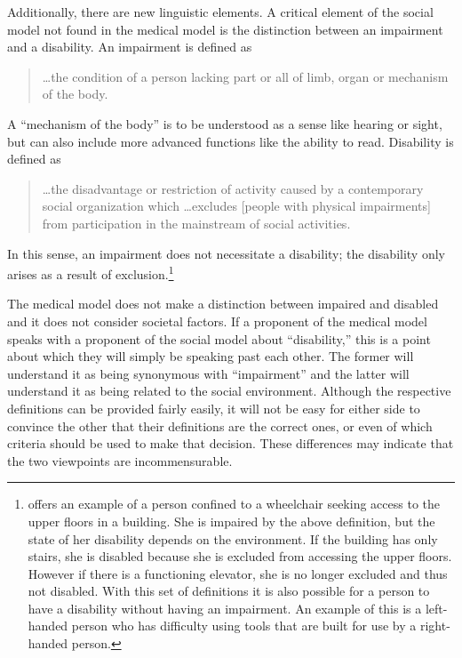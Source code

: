 \documentclass[a4paper]{article}
\begin{document}
Additionally, there are new linguistic elements. A critical element of the
social model not found in the medical model is the distinction between an
impairment and a disability. An impairment is defined as 
%
\begin{quote}
    \ldots the condition of a person lacking part or all of limb, organ or
    mechanism of the body. \citep{winter2003development} 
\end{quote}
%
A ``mechanism of the body'' is to be understood as a sense like hearing or
sight, but can also include more advanced functions like the ability to read.
Disability is defined as 
%
\begin{quote}
    \ldots the disadvantage or restriction of activity caused by a
    contemporary social organization which \ldots excludes [people with
    physical impairments] from participation in the mainstream of social
    activities. \citep{winter2003development}
\end{quote}
%
In this sense, an impairment does not necessitate a disability; the disability
only arises as a result of exclusion.\footnote{\cite{winter2003development}
offers an example of a person confined to a wheelchair seeking access to the
upper floors in a building. She is impaired by the above definition, but the
state of her disability depends on the environment. If the building has only
stairs, she is disabled because she is excluded from accessing the upper
floors. However if there is a functioning elevator, she is no longer excluded
and thus not disabled. With this set of definitions it is also possible for a
person to have a disability without having an impairment. An example of this
is a left-handed person who has difficulty using tools that are built for use
by a right-handed person.}

The medical model does not make a distinction between impaired and disabled
and it does not consider societal factors. If a proponent of the medical model
speaks with a proponent of the social model about ``disability,'' this is a
point about which they will simply be speaking past each other. The former
will understand it as being synonymous with ``impairment'' and the latter will
understand it as being related to the social environment. Although the
respective definitions can be provided fairly easily, it will not be easy for
either side to convince the other that their definitions are the correct ones,
or even of which criteria should be used to make that decision. These
differences may indicate that the two viewpoints are incommensurable.
\end{document}
